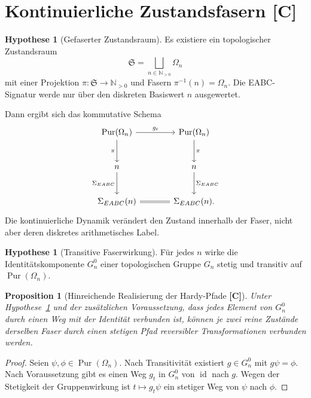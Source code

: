 \documentclass[11pt,a4paper,reqno]{amsart}
\newtheorem{proposition}[theorem]{Proposition}
\theoremstyle{definition}
\newtheorem{hypothesis}[theorem]{Hypothese}
\theoremstyle{remark}
\newcommand{\N}{\mathbb{N}}
\newcommand{\Pur}{\operatorname{Pur}}
\newcommand{\id}{\operatorname{id}}
\newcommand{\StatusC}{\textnormal{\textbf{[C]}}}
\begin{document}
\section{Kontinuierliche Zustandsfasern \StatusC}

\begin{hypothesis}[Gefaserter Zustandsraum]
\label{hyp:fibers}
Es existiere ein topologischer Zustandsraum
\begin{equation}
\mathfrak S
=
\bigsqcup_{n\in\N_{>0}}\Omega_n
\end{equation}
mit einer Projektion $\pi:\mathfrak S\to\N_{>0}$ und Fasern $\pi^{-1}(n)=\Omega_n$. Die EABC-Signatur werde nur über den diskreten Basiswert $n$ ausgewertet.
\end{hypothesis}

Dann ergibt sich das kommutative Schema
\begin{equation}
\begin{tikzcd}[row sep=large,column sep=large]
\Pur(\Omega_n)
  \arrow[r,"g_t"]
  \arrow[d,"\pi"']
&
\Pur(\Omega_n)
  \arrow[d,"\pi"]
\\
n
  \arrow[d,"\Sigma_{EABC}"']
&
n
  \arrow[d,"\Sigma_{EABC}"]
\\
\Sigma_{EABC}(n)
  \arrow[r,equal]
&
\Sigma_{EABC}(n).
\end{tikzcd}
\end{equation}
Die kontinuierliche Dynamik verändert den Zustand innerhalb der Faser, nicht aber deren diskretes arithmetisches Label.

\begin{hypothesis}[Transitive Faserwirkung]
\label{hyp:transitive}
Für jedes $n$ wirke die Identitätskomponente $G_n^0$ einer topologischen Gruppe $G_n$ stetig und transitiv auf $\Pur(\Omega_n)$.
\end{hypothesis}

\begin{proposition}[Hinreichende Realisierung der Hardy-Pfade \StatusC]
Unter Hypothese~\ref{hyp:transitive} und der zusätzlichen Voraussetzung, dass jedes Element von $G_n^0$ durch einen Weg mit der Identität verbunden ist, können je zwei reine Zustände derselben Faser durch einen stetigen Pfad reversibler Transformationen verbunden werden.
\end{proposition}

\begin{proof}
Seien $\psi,\phi\in\Pur(\Omega_n)$. Nach Transitivität existiert $g\in G_n^0$ mit $g\psi=\phi$. Nach Voraussetzung gibt es einen Weg $g_t$ in $G_n^0$ von $\id$ nach $g$. Wegen der Stetigkeit der Gruppenwirkung ist $t\mapsto g_t\psi$ ein stetiger Weg von $\psi$ nach $\phi$.
\end{proof}
\end{document}
